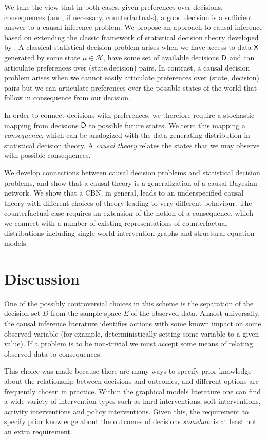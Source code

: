 We take the view that in both cases, given preferences over decisions, consequences (and, if necessary, counterfactuals), a good decision is a sufficient answer to a causal inference problem. We propose an approach to causal inference based on extending the classic framework of statistical decision theory developed by \cite{wald_statistical_1950}. A classical statistical decision problem arises when we have access to data $\mathsf{X}$ generated by some state $\mu\in \mathscr{H}$, have some set of available decisions $\mathsf{D}$ and can articulate preferences over (state,decision) pairs. In contrast, a causal decision problem arises when we cannot easily articulate preferences over (state, decision) pairs but we can articulate preferences over the possible states of the world that follow in consequence from our decision.

In order to connect decisions with preferences, we therefore require a stochastic mapping from decisions $\mathsf{D}$ to possible future states. We term this mapping a \emph{consequence}, which can be analogized with the data-generating distribution in statistical decision theory. A \emph{causal theory} relates the states that we may observe with possible consequences.

We develop connections between causal decision problems and statistical decision problems, and show that a causal theory is a generalization of a causal Bayesian network. We show that a CBN, in general, leads to an underspecified causal theory with different choices of theory leading to very different behaviour. The counterfactual case requires an extension of the notion of a consequence, which we connect with a number of existing representations of counterfactual distributions including single world intervention graphs and structural equation models.


\section{Discussion}

One of the possibly controversial choices in this scheme is the separation of the decision set $D$ from the sample space $E$ of the observed data. Almost universally, the causal inference literature identifies actions with some known impact on some observed variable (for example, deterministically setting some variable to a given value). If a problem is to be non-trivial we must accept some means of relating observed data to consequences.

This choice was made because there are many ways to specify prior knowledge about the relationship between decisions and outcomes, and different options are frequently chosen in practice. Within the graphical models literature one can find a wide variety of intervention types such as hard interventions, soft interventions, activity interventions and policy interventions. Given this, the requirement to specify prior knowledge about the outcomes of decisions \emph{somehow} is at least not an extra requirement.

